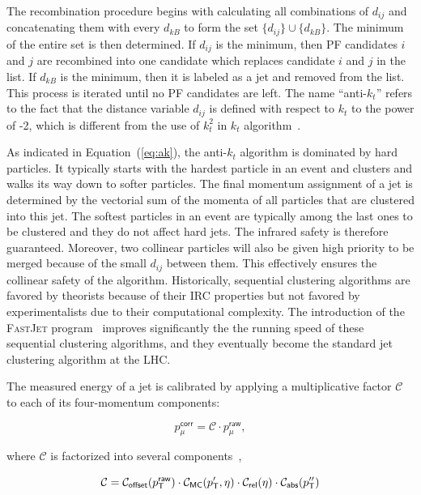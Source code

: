 The recombination procedure begins with calculating all combinations of $d_{ij}$ and concatenating them with every $d_{kB}$ to form the set $\{d_{ij}\}\cup\{d_{kB}\}$. The minimum of the entire set is then determined. If $d_{ij}$ is the minimum, then \ac{PF} candidates $i$ and $j$ are recombined into one candidate which replaces candidate $i$ and $j$ in the list. If $d_{kB}$ is the minimum, then it is labeled as a jet and removed from the list. This process is iterated until no \ac{PF} candidates are left. The name ``anti-$k_t$'' refers to the fact that the distance variable $d_{ij}$ is defined with respect to $k_t$ to the power of -2, which is different from the use of $k_t^2$ in $k_t$ algorithm~\cite{Ellis:1993tq}. 

As indicated in Equation~(\ref{eq:ak}), the anti-$k_t$ algorithm is dominated by hard particles. It typically starts with the hardest particle in an event and clusters and walks its way down to softer particles. The final momentum assignment of a jet is determined by the vectorial sum of the momenta of all particles that are clustered into this jet. The softest particles in an event are typically among the last ones to be clustered and they do not affect hard jets. The infrared safety is therefore guaranteed. Moreover, two collinear particles will also be given high priority to be merged because of the small $d_{ij}$ between them. This effectively ensures the collinear safety of the algorithm. Historically, sequential clustering algorithms are favored by theorists because of their \ac{IRC} properties but not favored by experimentalists due to their computational complexity. The introduction of the \textsc{FastJet} program~\cite{Cacciari:2011ma} improves significantly the the running speed of these sequential clustering algorithms, and they eventually become the standard jet clustering algorithm at the \ac{LHC}.

The measured energy of a jet is calibrated by applying a multiplicative factor $\mathcal{C}$ to each of its four-momentum components:

\begin{equation}
p^{\textsf{corr}}_{\mu} = \mathcal{C}\cdot p^{\textsf{raw}}_{\mu},
\end{equation}

where $\mathcal{C}$ is factorized into several components~\cite{CMS:2011shu},

\begin{equation}
\mathcal{C} = \mathcal{C}_{\textsf{offset}}(p_{\textsf{T}}^{\textsf{raw}})\cdot\mathcal{C}_{\textsf{MC}}(p_{\textsf{T}}^{\prime},\eta)\cdot\mathcal{C}_{\textsf{rel}}(\eta)\cdot\mathcal{C}_{\textsf{abs}}(p_{\textsf{T}}^{\prime\prime})
\end{equation}

